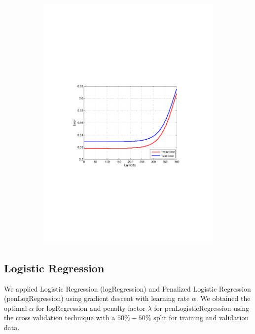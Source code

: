 \begin{figure}[h]
\begin{subfigure}[b]{0.45\textwidth}
   \includegraphics[clip, trim=4cm 9cm 3cm 10cm, width=\textwidth]{figures/Lambda_pLG.pdf}
    \label{fig:Lambda_pLr}
  \end{subfigure}
  \hfill
\end{figure}

\subsection{Logistic Regression}

We applied Logistic Regression (logRegression) and Penalized Logistic Regression (penLogRegression) using gradient descent with learning rate $\alpha$.  We obtained the optimal $\alpha$ for logRegression   and penalty factor $\lambda$ for penLogisticRegression using the cross validation technique with a $50\%-50\%$ split for training and validation data.

